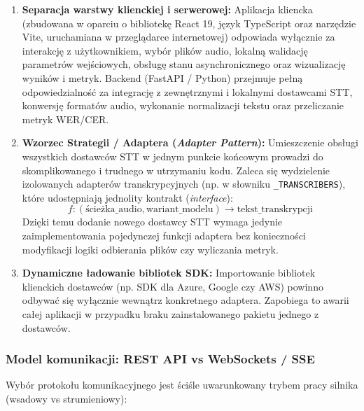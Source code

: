 \begin{enumerate}
    \item \textbf{Separacja warstwy klienckiej i serwerowej:} Aplikacja kliencka (zbudowana w oparciu o bibliotekę React 19, język TypeScript oraz narzędzie Vite, uruchamiana w przeglądarce internetowej) odpowiada wyłącznie za interakcję z użytkownikiem, wybór plików audio, lokalną walidację parametrów wejściowych, obsługę stanu asynchronicznego oraz wizualizację wyników i metryk. Backend (FastAPI / Python) przejmuje pełną odpowiedzialność za integrację z zewnętrznymi i lokalnymi dostawcami STT, konwersję formatów audio, wykonanie normalizacji tekstu oraz przeliczanie metryk WER/CER.
    \item \textbf{Wzorzec Strategii / Adaptera (\textit{Adapter Pattern}):} Umieszczenie obsługi wszystkich dostawców STT w jednym punkcie końcowym prowadzi do skomplikowanego i trudnego w utrzymaniu kodu. Zaleca się wydzielenie izolowanych adapterów transkrypcyjnych (np. w słowniku \texttt{\_TRANSCRIBERS}), które udostępniają jednolity kontrakt (\textit{interface}):
    \begin{equation}
        f: (\text{ścieżka\_audio}, \text{wariant\_modelu}) \to \text{tekst\_transkrypcji}
    \end{equation}
    Dzięki temu dodanie nowego dostawcy STT wymaga jedynie zaimplementowania pojedynczej funkcji adaptera bez konieczności modyfikacji logiki odbierania plików czy wyliczania metryk.
    \item \textbf{Dynamiczne ładowanie bibliotek SDK:} Importowanie bibliotek klienckich dostawców (np. SDK dla Azure, Google czy AWS) powinno odbywać się wyłącznie wewnątrz konkretnego adaptera. Zapobiega to awarii całej aplikacji w przypadku braku zainstalowanego pakietu jednego z dostawców.
\end{enumerate}

\subsubsection{Model komunikacji: REST API vs WebSockets / SSE}

Wybór protokołu komunikacyjnego jest ściśle uwarunkowany trybem pracy silnika (wsadowy vs strumieniowy):

